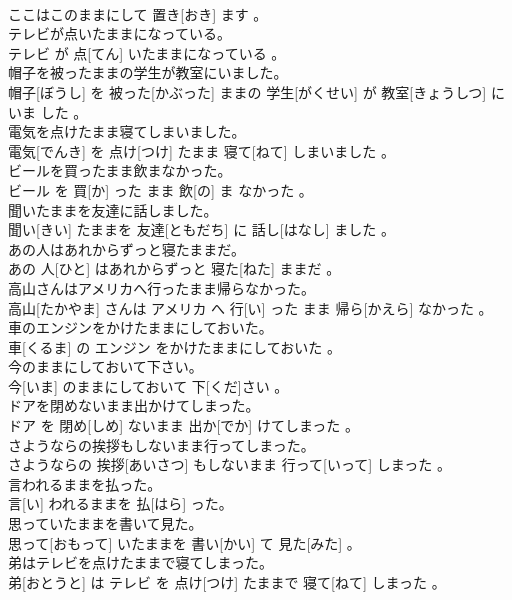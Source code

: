 \documentclass[8pt]{extreport}
\begin{document}
\begin{CJK}{UTF8}{min}
\\	ここはこのままにして 置き[おき] ます 。
\\	テレビが点いたままになっている。	
\\	テレビ が 点[てん] いたままになっている 。
\\	帽子を被ったままの学生が教室にいました。	
\\	帽子[ぼうし] を 被った[かぶった] ままの 学生[がくせい] が 教室[きょうしつ] に いま した 。
\\	電気を点けたまま寝てしまいました。	
\\	電気[でんき] を 点け[つけ] たまま 寝て[ねて] しまいました 。
\\	ビールを買ったまま飲まなかった。	
\\	ビール を 買[か] った まま 飲[の] ま なかった 。
\\	聞いたままを友達に話しました。	
\\	聞い[きい] たままを 友達[ともだち] に 話し[はなし] ました 。
\\	あの人はあれからずっと寝たままだ。	
\\	あの 人[ひと] はあれからずっと 寝た[ねた] ままだ 。
\\	高山さんはアメリカへ行ったまま帰らなかった。	
\\	高山[たかやま] さんは アメリカ へ 行[い] った まま 帰ら[かえら] なかった 。
\\	車のエンジンをかけたままにしておいた。	
\\	車[くるま] の エンジン をかけたままにしておいた 。
\\	今のままにしておいて下さい。	
\\	今[いま] のままにしておいて 下[くだ]さい 。
\\	ドアを閉めないまま出かけてしまった。	
\\	ドア を 閉め[しめ] ないまま 出か[でか] けてしまった 。
\\	さようならの挨拶もしないまま行ってしまった。	
\\	さようならの 挨拶[あいさつ] もしないまま 行って[いって] しまった 。
\\	言われるままを払った。	
\\	言[い] われるままを 払[はら] った。
\\	思っていたままを書いて見た。	
\\	思って[おもって] いたままを 書い[かい] て 見た[みた] 。
\\	弟はテレビを点けたままで寝てしまった。	
\\	弟[おとうと] は テレビ を 点け[つけ] たままで 寝て[ねて] しまった 。

\end{CJK}
\end{document}
